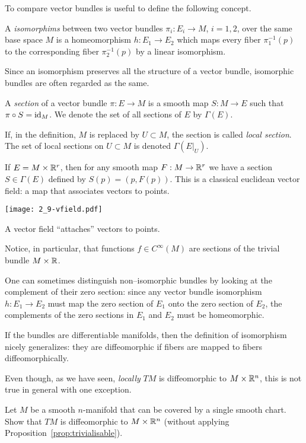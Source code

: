 To compare vector bundles is useful to define the following concept.
\begin{definition}
  A \emph{isomorphims} between two vector bundles $\pi_i: E_i \to M$, $i=1,2$, over the same base space $M$ is a homeomorphism $h:E_1 \to E_2$ which maps every fiber $\pi_1^{-1}(p)$ to the corresponding fiber $\pi_2^{-1}(p)$ by a linear isomorphism.
\end{definition}

Since an isomorphism preserves all the structure of a vector bundle, isomorphic bundles are often regarded as the same.

\begin{definition}
  A \emph{section} of a vector bundle $\pi:E \to M$ is a smooth map $S:M \to E$ such that $\pi\circ S = \operatorname{id}_M$. We denote the set of all sections of $E$ by $\Gamma(E)$.
  
  If, in the definition, $M$ is replaced by $U\subset M$, the section is called \emph{local section}. The set of local sections on $U\subset M$ is denoted $\Gamma(E|_U)$.
\end{definition}

\begin{example}
  If $E = M\times \mathbb{R}^r$, then for any smooth map $F: M\to\mathbb{R}^r$ we have a section $S\in\Gamma(E)$ defined by $S(p) = (p, F(p))$. This is a classical euclidean vector field: a map that associates vectors to points.
  \begin{marginfigure}
    \texttt{[image: 2\_9-vfield.pdf]}
    \caption{A vector field ``attaches'' vectors to points.}
  \end{marginfigure}
  \noindent Notice, in particular, that functions $f\in C^\infty(M)$ are sections of the trivial bundle $M\times\mathbb{R}$.
\end{example}

One can sometimes distinguish non--isomorphic bundles by looking at the complement of their zero section: since any vector bundle isomorphism $h:E_1\to E_2$ must map the zero section of $E_1$ onto the zero section of $E_2$, the complements of the zero sections in $E_1$ and $E_2$ must be homeomorphic.

If the bundles are differentiable manifolds, then the definition of isomorphism nicely generalizes: they are diffeomorphic if fibers are mapped to fibers diffeomorphically.

Even though, as we have seen, \emph{locally} $TM$ is diffeomorphic to $M\times\mathbb{R}^n$, this is not true in general with one exception.
\begin{exercise}\label{ex:trivialisable}
  Let $M$ be a smooth $n$-manifold that can be covered by a single smooth chart.
  Show that $TM$ is diffeomorphic to $M\times\mathbb{R}^n$ (without applying Proposition~\ref{prop:trivialisable}).
\end{exercise}

